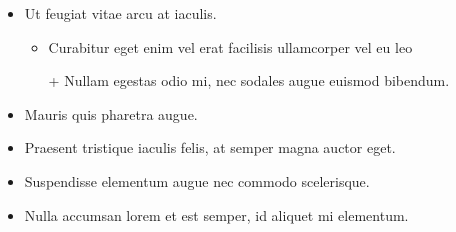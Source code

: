 \documentclass[10pt]{article}
\begin{document}
\begin{itemize}
\item{Ut feugiat vitae arcu at iaculis.
\begin{itemize}
\item{Curabitur eget enim vel erat facilisis ullamcorper vel eu leo}
\item[+]{Nullam egestas odio mi, nec sodales augue euismod bibendum.}
\end{itemize}}
\item{Mauris quis pharetra augue.}
\item{Praesent tristique iaculis felis, at semper magna auctor eget.}
\item{Suspendisse elementum augue nec commodo scelerisque.}
\item{Nulla accumsan lorem et est semper, id aliquet mi elementum.}
\end{itemize}
\end{document}
